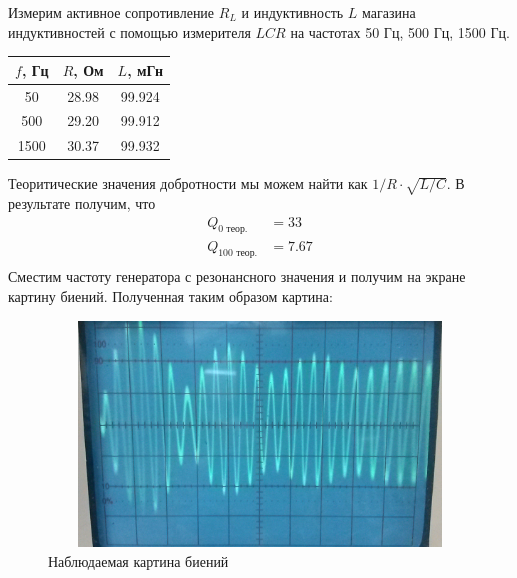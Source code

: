 \documentclass[12pt]{article}
\begin{document}
\par
	Измерим активное сопротивление $R_L$ и индуктивность $L$ магазина индуктивностей с помощью измерителя $LCR$ на частотах 50 Гц, 500 Гц, 1500 Гц.
\begin{table}[h!]
	\centering
	\begin{tabular}{|c|c|c|}
	\hline
	$f$, Гц & $R$, Ом & $L$, мГн \\
	\hline
	50 & 28.98 & 99.924 \\
	\hline
	500 & 29.20 & 99.912 \\
	\hline
	1500 & 30.37 & 99.932 \\	
	\hline
	\end{tabular}	
\end{table}
\newpage
\par
Теоритические значения добротности мы можем найти как $1 / R \cdot \sqrt{L / C}$. В результате получим, что
		\begin{align*}
			Q_\text{0 теор.} &= 33  \\
			Q_\text{100 теор.} &= 7.67 \\
		\end{align*}
	Сместим частоту генератора с резонансного значения и получим на экране картину биений. Полученная таким образом картина:
\begin{figure}[h!]
	\centering
	\includegraphics[width = 12cm, height = 6cm]{image3.png}
	\caption{Наблюдаемая картина биений}
\end{figure}	 					
\end{document}

